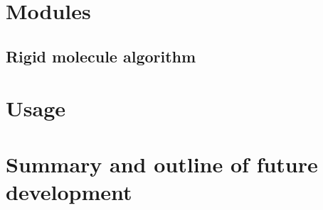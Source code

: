 \documentclass[a4paper,titlepage,twoside,fleqn,12pt]{book}
\begin{document}
\begin{refsection}
\section{Modules}

\subsection{Rigid molecule algorithm}

\section{Usage}

\section{Summary and outline of future development}

\printbibliography[heading=subbibintoc,title={References}]
\end{refsection}

\end{document}
